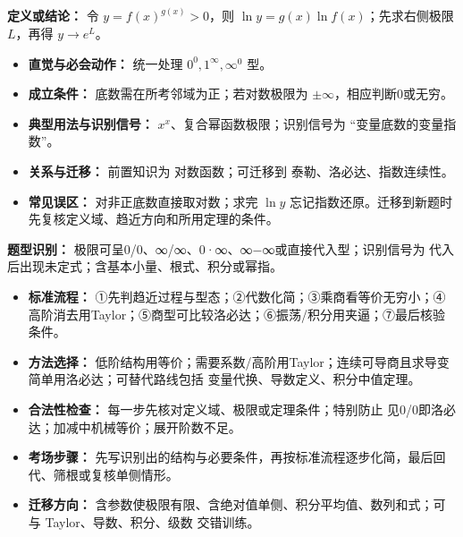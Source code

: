 \begin{knowledgeBox}
\textbf{定义或结论：} 令 $y=f(x)^{g(x)}>0$，则 $\ln y=g(x)\ln f(x)$；先求右侧极限 $L$，再得 $y\to e^L$。

\begin{itemize}
  \item \textbf{直觉与必会动作：} 统一处理 $0^0,1^\infty,\infty^0$ 型。
  \item \textbf{成立条件：} 底数需在所考邻域为正；若对数极限为 $\pm\infty$，相应判断0或无穷。
  \item \textbf{典型用法与识别信号：} $x^x$、复合幂函数极限；识别信号为 “变量底数的变量指数”。
  \item \textbf{关系与迁移：} 前置知识为 对数函数；可迁移到 泰勒、洛必达、指数连续性。
  \item \textbf{常见误区：} 对非正底数直接取对数；求完 $\ln y$ 忘记指数还原。迁移到新题时先复核定义域、趋近方向和所用定理的条件。
\end{itemize}
\end{knowledgeBox}

\begin{knowledgeBox}
\textbf{题型识别：} 极限可呈0/0、∞/∞、0·∞、∞−∞或直接代入型；识别信号为 代入后出现未定式；含基本小量、根式、积分或幂指。

\begin{itemize}
  \item \textbf{标准流程：} ①先判趋近过程与型态；②代数化简；③乘商看等价无穷小；④高阶消去用Taylor；⑤商型可比较洛必达；⑥振荡/积分用夹逼；⑦最后核验条件。
  \item \textbf{方法选择：} 低阶结构用等价；需要系数/高阶用Taylor；连续可导商且求导变简单用洛必达；可替代路线包括 变量代换、导数定义、积分中值定理。
  \item \textbf{合法性检查：} 每一步先核对定义域、极限或定理条件；特别防止 见0/0即洛必达；加减中机械等价；展开阶数不足。
  \item \textbf{考场步骤：} 先写识别出的结构与必要条件，再按标准流程逐步化简，最后回代、筛根或复核单侧情形。
  \item \textbf{迁移方向：} 含参数使极限有限、含绝对值单侧、积分平均值、数列和式；可与 Taylor、导数、积分、级数 交错训练。
\end{itemize}
\end{knowledgeBox}

